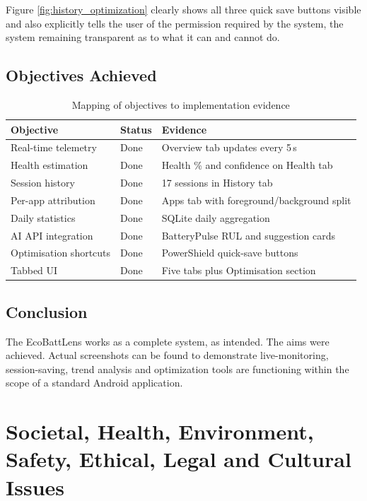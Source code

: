 \documentclass[12pt,a4paper]{report}
\begin{document}
Figure \ref{fig:history_optimization} clearly shows all three quick save buttons visible and also explicitly tells the user of the permission required by the system, the system remaining transparent as to what it can and cannot do.

\section{Objectives Achieved}

\begin{table}[H]
\caption{Mapping of objectives to implementation evidence}
\centering
\small
\begin{tabular}{lll}
\toprule
\textbf{Objective} & \textbf{Status} & \textbf{Evidence}\\
\midrule
Real-time telemetry    & Done & Overview tab updates every 5\,s\\
Health estimation      & Done & Health \% and confidence on Health tab\\
Session history        & Done & 17 sessions in History tab\\
Per-app attribution    & Done & Apps tab with foreground/background split\\
Daily statistics       & Done & SQLite daily aggregation\\
AI API integration     & Done & BatteryPulse RUL and suggestion cards\\
Optimisation shortcuts & Done & PowerShield quick-save buttons\\
Tabbed UI              & Done & Five tabs plus Optimisation section\\
\bottomrule
\end{tabular}
\end{table}

\section{Conclusion}

The EcoBattLens works as a complete system, as intended. The aims were achieved. Actual screenshots can be found to demonstrate live-monitoring, session-saving, trend analysis and optimization tools are functioning within the scope of a standard Android application.

\chapter{Societal, Health, Environment, Safety, Ethical, Legal and Cultural Issues}
\end{document}
